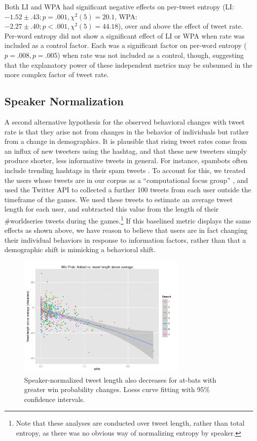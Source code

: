 \documentclass[11pt,letterpaper]{article}
\begin{document}
Both LI and WPA had significant negative effects on per-tweet entropy (LI: $-1.52 \pm .43; p=.001, \chi^2(5)=20.1$, WPA: $-2.27 \pm .40; p<.001, \chi^2(5)=44.18$), over and above the effect of tweet rate.  Per-word entropy did not show a significant effect of LI or WPA when rate was included as a control factor. Each was a significant factor on per-word entropy ($p=.008,p=.005$) when rate was not included as a control, though, suggesting that the explanatory power of these independent metrics may be subsumed in the more complex factor of tweet rate.

\subsection{Speaker Normalization}
\label{sect:speaker-normalization}

A second alternative hypothesis for the observed behavioral changes with tweet rate is that they arise not from changes in the behavior of individuals but rather from a change in demographics.  It is plausible that rising tweet rates come from an influx of new tweeters using the hashtag, and that these new tweeters simply produce shorter, less informative tweets in general.  For instance, spambots often include trending hashtags in their spam tweets \cite{martinez2013}. To account for this, we treated the users whose tweets are in our corpus as a ``computational focus group'' \cite{lin2013,lin2014}, and used the Twitter API to collected a further 100 tweets from each user outside the timeframe of the games.  We used these tweets to estimate an average tweet length for each user, and subtracted this value from the length of their \#worldseries tweets during the games.\footnote{Note that these analyses are conducted over tweet length, rather than total entropy, as there was no obvious way of normalizing entropy by speaker.} If this baselined metric displays the same effects as shown above, we have reason to believe that users are in fact changing their individual behaviors in response to information factors, rather than that a demographic shift is mimicking a behavioral shift.

\begin{figure}
 \centering
  \includegraphics[width=3.25in]{figures/final-wpa-ld-agg}
 \caption{Speaker-normalized tweet length also decreases for at-bats with greater win probability changes. Loess curve fitting with 95\% confidence intervals.}\label{fig:wpa-ld-agg}\vspace*{-.5em}
\end{figure}
\end{document}
